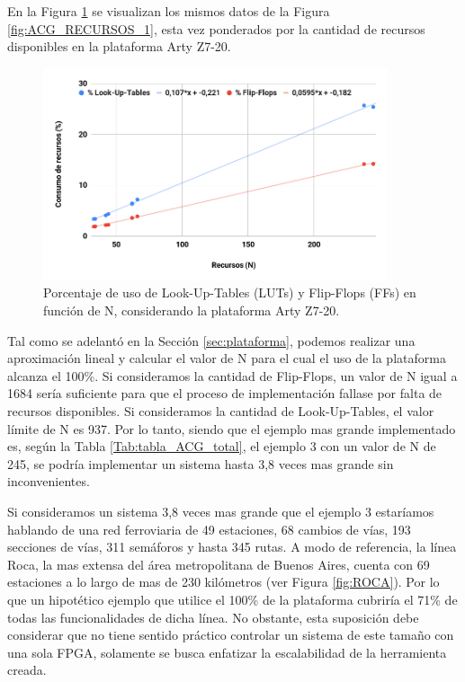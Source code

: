 	En la Figura \ref{fig:ACG_RECURSOS_2} se visualizan los mismos datos de la Figura \ref{fig:ACG_RECURSOS_1}, esta vez ponderados por la cantidad de recursos disponibles en la plataforma Arty Z7-20. 
	
	\begin{figure}[H]
		\centering
		\includegraphics[origin = c, width=0.9\textwidth]{resultados-obtenidos/ejemplo1/images/recursos_2}
		\centering\caption{Porcentaje de uso de Look-Up-Tables (LUTs) y Flip-Flops (FFs) en función de N, considerando la plataforma Arty Z7-20.}
		\label{fig:ACG_RECURSOS_2}
	\end{figure}
	
	Tal como se adelantó en la Sección \ref{sec:plataforma}, podemos realizar una aproximación lineal y calcular el valor de N para el cual el uso de la plataforma alcanza el 100\%. Si consideramos la cantidad de Flip-Flops, un valor de N igual a 1684 sería suficiente para que el proceso de implementación fallase por falta de recursos disponibles. Si consideramos la cantidad de Look-Up-Tables, el valor límite de N es 937. Por lo tanto, siendo que el ejemplo mas grande implementado es, según la Tabla \ref{Tab:tabla_ACG_total}, el ejemplo 3 con un valor de N de 245, se podría implementar un sistema hasta 3,8 veces mas grande sin inconvenientes.
	
	 Si consideramos un sistema 3,8 veces mas grande que el ejemplo 3 estaríamos hablando de una red ferroviaria de 49 estaciones, 68 cambios de vías, 193 secciones de vías, 311 semáforos y hasta 345 rutas. A modo de referencia, la línea Roca, la mas extensa del área metropolitana de Buenos Aires, cuenta con 69 estaciones a lo largo de mas de 230 kilómetros \cite{TRENES} (ver Figura \ref{fig:ROCA}). Por lo que un hipotético ejemplo que utilice el 100\% de la plataforma cubriría el 71\% de todas las funcionalidades de dicha línea. No obstante, esta suposición debe considerar que no tiene sentido práctico controlar un sistema de este tamaño con una sola FPGA, solamente se busca enfatizar la escalabilidad de la herramienta creada.
	 
